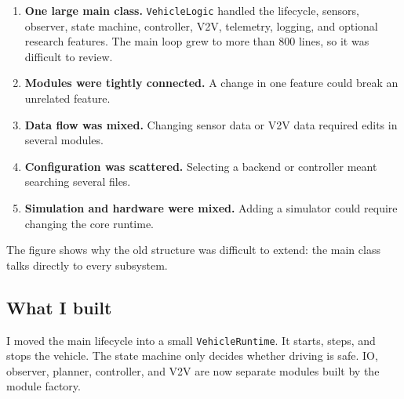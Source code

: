 \documentclass[11pt,a4paper]{article}
\begin{document}
\begin{enumerate}[leftmargin=*]
    \item \textbf{One large main class.} \texttt{VehicleLogic} handled the lifecycle, sensors, observer, state machine, controller, V2V, telemetry, logging, and optional research features.
    {\color{blue} The main loop grew to more than 800 lines, so it was difficult to review.}

    \item \textbf{Modules were tightly connected.} A change in one feature could break an unrelated feature.

    \item \textbf{Data flow was mixed.} Changing sensor data or V2V data required edits in several modules.

    \item \textbf{Configuration was scattered.} Selecting a backend or controller meant searching several files.

    \item \textbf{Simulation and hardware were mixed.} Adding a simulator could require changing the core runtime.
\end{enumerate}

The figure shows why the old structure was difficult to extend: the main class talks directly to every subsystem.


\subsection{What I built}

I moved the main lifecycle into a small \texttt{VehicleRuntime}. It starts, steps, and stops the vehicle. The state machine only decides whether driving is safe. IO, observer, planner, controller, and V2V are now separate modules built by the module factory.

\end{document}
